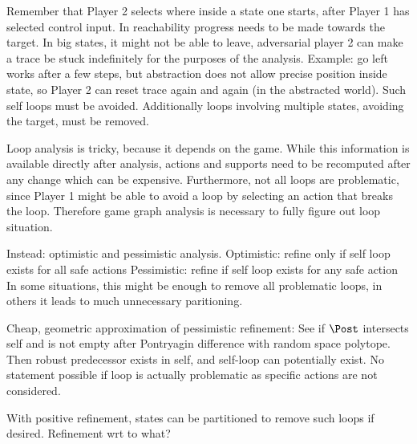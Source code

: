 \stopsubsection


    \startalgorithmic[numbering=no,margin=0em]
    \stopalgorithmic
    \startalgorithmic
        \ELSE
        \ENDIF
    \stopalgorithmic
\stopbuffer

\startsubsection[title={Loops},reference={sec:refinement-neutral-loops}]


    Remember that Player 2 selects where inside a state one starts, after Player 1 has selected control input.
    In reachability progress needs to be made towards the target.
    In big states, it might not be able to leave, adversarial player 2 can make a trace be stuck indefinitely for the purposes of the analysis.
    Example: go left works after a few steps, but abstraction does not allow precise position inside state, so Player 2 can reset trace again and again (in the abstracted world).
    Such self loops must be avoided.
    Additionally loops involving multiple states, avoiding the target, must be removed.

    Loop analysis is tricky, because it depends on the game.
    While this information is available directly after analysis, actions and supports need to be recomputed after any change which can be expensive.
    Furthermore, not all loops are problematic, since Player 1 might be able to avoid a loop by selecting an action that breaks the loop.
    Therefore game graph analysis is necessary to fully figure out loop situation.

    Instead: optimistic and pessimistic analysis.
    Optimistic: refine only if self loop exists for all safe actions
    Pessimistic: refine if self loop exists for any safe action
    In some situations, this might be enough to remove all problematic loops, in others it leads to much unnecessary paritioning.

    Cheap, geometric approximation of pessimistic refinement:
    See if $\Post$ intersects self and is not empty after Pontryagin difference with random space polytope.
    Then robust predecessor exists in self, and self-loop can potentially exist.
    No statement possible if loop is actually problematic as specific actions are not considered.

    With positive refinement, states can be partitioned to remove such loops if desired.
    Refinement wrt to what? %

\stopsubsection


